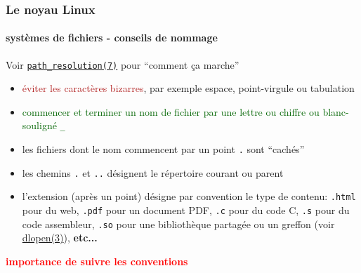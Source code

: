 \documentclass[xcolor=svgnames,final,smaller,a4]{beamer}
\begin{document}
\begin{frame}
  \frametitle{Le noyau Linux}
  \framesubtitle{systèmes de fichiers - conseils de nommage}

  Voir \href{https://man7.org/linux/man-pages/man7/path_resolution.7.html}{\texttt{path\_resolution(7)}} pour ``comment ça marche''
  
  \begin{itemize}
  \item \textcolor{FireBrick}{éviter les caractères bizarres}, par exemple espace, point-virgule ou tabulation
  \item \textcolor{DarkGreen}{commencer et terminer un nom de fichier par une lettre ou chiffre ou blanc-souligné {\texttt{\_}}}
  \item les fichiers dont le nom commencent par un point \texttt{.} sont ``cachés''
  \item les chemins \texttt{.} et \texttt{..} désignent le répertoire courant ou parent
    \item l'extension (après un point) désigne par convention le type de contenu: \texttt{.html} pour du web, \texttt{.pdf} pour un document PDF, \texttt{.c} pour du code C, \texttt{.s} pour du code assembleur, \texttt{.so} pour une bibliothèque partagée ou un greffon (voir \href{https://man7.org/linux/man-pages/man3/dlopen.3.html}{dlopen(3)}), \textbf{etc...}
  \end{itemize}


  \vspace{0.3cm}
  
  \textbf{\textcolor{red}{importance de suivre les conventions}}
\end{frame}
\end{document}
